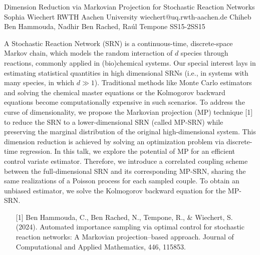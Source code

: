 \begin{talk}
  {Dimension Reduction via Markovian Projection for Stochastic Reaction Networks}%
  {Sophia Wiechert}%
  {RWTH Aachen University}%
  {wiechert@uq.rwth-aachen.de}%
  {Chiheb Ben Hammouda, Nadhir Ben Rached, Raúl Tempone}%
{}{}{SS15-2}{SS15}


A Stochastic Reaction Network (SRN) is a continuous-time, discrete-space Markov chain, which models the random interaction of $d$ species through reactions, commonly applied in (bio)chemical systems.
Our special interest lays in estimating statistical quantities in high dimensional SRNs (i.e., in systems with many species, in which $d\gg1$). Traditional methods like Monte Carlo estimators and solving the chemical master equations or the Kolmogorov backward equations become computationally expensive in such scenarios.
To address the curse of dimensionality, we propose the Markovian projection (MP) technique [1] to reduce the SRN to a lower-dimensional SRN (called MP-SRN) while preserving the marginal distribution of the original high-dimensional system. This dimension reduction is achieved by solving an optimization problem via discrete-time regression.
In this talk, we explore the potential of MP for an efficient control variate estimator.  Therefore,  we introduce a correlated coupling scheme between the full-dimensional SRN and its corresponding MP-SRN, sharing the same realizations of a Poisson process for each sampled couple. To obtain an unbiased estimator, we solve the Kolmogorov backward equation for the MP-SRN.




\medskip


\begin{enumerate}
	\item[{[1]}] Ben Hammouda, C., Ben Rached, N., Tempone, R., \& Wiechert, S. (2024). Automated importance sampling via optimal control for stochastic reaction networks: A Markovian projection–based approach. Journal of Computational and Applied Mathematics, 446, 115853.
\end{enumerate}

\end{talk}

